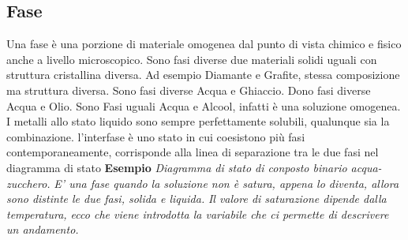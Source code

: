 \documentclass{article}%
\begin{document}
\subsection{ Fase }%
\label{subsec:Fase}%
Una fase è una porzione di materiale omogenea dal punto di vista chimico e fisico anche a livello microscopico.\newline%
%
Sono fasi diverse due materiali solidi uguali con struttura cristallina diversa.\newline%
%
Ad esempio Diamante e Grafite, stessa composizione ma struttura diversa.\newline%
%
Sono fasi diverse Acqua e Ghiaccio.\newline%
%
Dono fasi diverse Acqua e Olio.\newline%
%
Sono Fasi uguali Acqua e Alcool, infatti è una soluzione omogenea.\newline%
%
\newline%
%
I metalli allo stato liquido sono sempre perfettamente solubili, qualunque sia la combinazione.\newline%
%
\newline%
%
l'interfase è uno stato in cui coesistono più fasi contemporaneamente, corrisponde alla linea di separazione tra le due fasi nel diagramma di stato\newline%
%
\newline%
%
\textbf{ Esempio \newline%
}%
\textit{Diagramma di stato di conposto binario acqua{-}zucchero.\newline%
}%
\textit{E' una fase quando la soluzione non è satura, appena lo diventa, allora sono distinte le due fasi, solida e liquida.\newline%
}%
\textit{Il valore di saturazione dipende dalla temperatura, ecco che viene introdotta la variabile che ci permette di descrivere un andamento.\newline%
}%
\newline%

%
\end{document}
